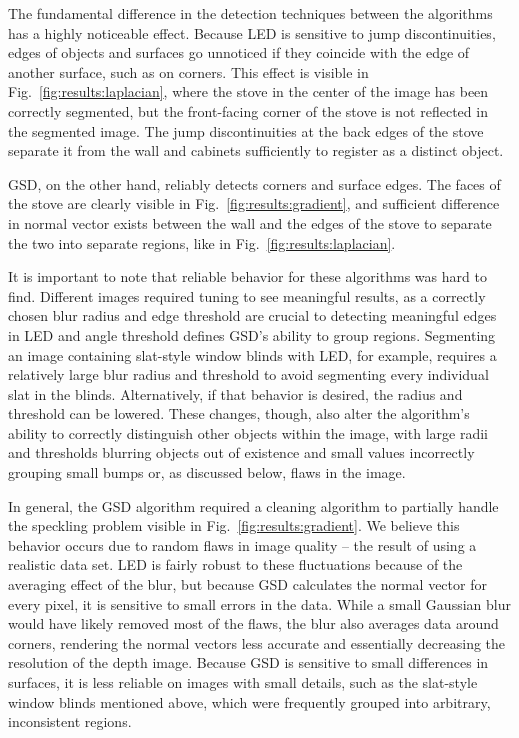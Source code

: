 The fundamental difference in the detection techniques between the algorithms has a highly noticeable effect.  Because LED is sensitive to jump discontinuities, edges of objects and surfaces go unnoticed if they coincide with the edge of another surface, such as on corners.  This effect is visible in  Fig.~\ref{fig:results:laplacian}, where the stove in the center of the image has been correctly segmented, but the front-facing corner of the stove is not reflected in the segmented image.  The jump discontinuities at the back edges of the stove separate it from the wall and cabinets sufficiently to register as a distinct object.

GSD, on the other hand, reliably detects corners and surface edges.  The faces of the stove are clearly visible in Fig.~\ref{fig:results:gradient}, and sufficient difference in normal vector exists between the wall and the edges of the stove to separate the two into separate regions, like in Fig.~\ref{fig:results:laplacian}.  

It is important to note that reliable behavior for these algorithms was hard to find.  Different images required tuning to see meaningful results, as a correctly chosen blur radius and edge threshold are crucial to detecting meaningful edges in LED and angle threshold defines GSD's ability to group regions.  Segmenting an image containing slat-style window blinds with LED, for example, requires a relatively large blur radius and threshold to avoid segmenting every individual slat in the blinds.  Alternatively, if that behavior is desired, the radius and threshold can be lowered.  These changes, though, also alter the algorithm's ability to correctly distinguish other objects within the image, with large radii and thresholds blurring objects out of existence and small values incorrectly grouping small bumps or, as discussed below, flaws in the image.

In general, the GSD algorithm required a cleaning algorithm to partially handle the speckling problem visible in Fig.~\ref{fig:results:gradient}.  We believe this behavior occurs due to random flaws in image quality -- the result of using a realistic data set.  LED is fairly robust to these fluctuations because of the averaging effect of the blur, but because GSD calculates the normal vector for every pixel, it is sensitive to small errors in the data.  While a small Gaussian blur would have likely removed most of the flaws, the blur also averages data around corners, rendering the normal vectors less accurate and essentially decreasing the resolution of the depth image.  Because GSD is sensitive to small differences in surfaces, it is less reliable on images with small details, such as the slat-style window blinds mentioned above, which were frequently grouped into arbitrary, inconsistent regions.